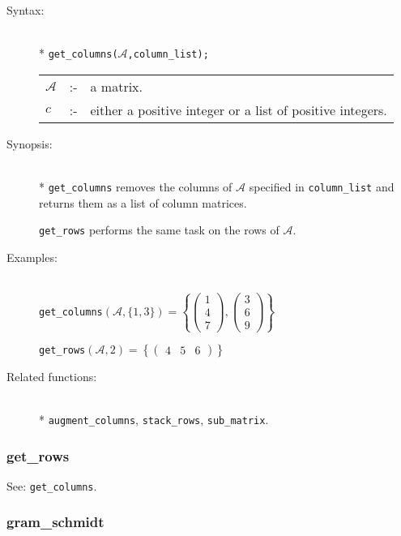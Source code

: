 \begin{description}
\item[Syntax:]\mbox{}\\*
\texttt{get\_columns($\mathcal{A}$,column\_list);}\\[2mm]
\begin{tabular}{l l l}
$\mathcal{A}$ &:-& a matrix. \\
$c$          &:-& either a positive integer or a list of positive
                integers.
\end{tabular}

\item[Synopsis:]\mbox{}\\*
\texttt{get\_columns} removes the columns of $\mathcal{A}$ specified in
                \texttt{column\_list} and returns them as a list of column
                matrices.

 \texttt{get\_rows} performs the same task on the rows of
                $\mathcal{A}$.

\item[Examples:]\mbox{}\\
  \texttt{get\_columns}\((\mathcal{A},\{1,3\})  =
  \left\{
  \begin{pmatrix} 1 \\ 4 \\ 7 \end{pmatrix},
  \begin{pmatrix} 3 \\ 6 \\ 9 \end{pmatrix}
  \right\}\)

  \texttt{get\_rows}\((\mathcal{A},2)  =
  \left\{
  \begin{pmatrix} 4 & 5 & 6 \end{pmatrix}
  \right\}\)

\item[Related functions:]\mbox{}\\*
\texttt{augment\_columns}, \texttt{stack\_rows}, \texttt{sub\_matrix}.
\end{description}


\subsubsection{get\_rows}
\label{linalg:get_rows}
See: \texttt{get\_columns}.


\subsubsection{gram\_schmidt}
\label{linalg:gram_schmidt}

